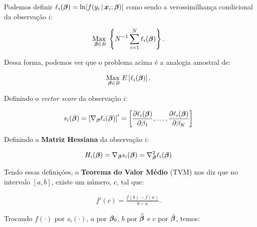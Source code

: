 \documentclass[11pt,oneside,a4paper]{article}
\numberwithin{equation}{section}
\begin{document}
\begin{description}
\begin{description}
\noindent
Podemos definir
$\ell_{i}( \boldsymbol{\beta} ) = \ln[ f( y_{i} \, | \, \boldsymbol{x}_{i} ; \boldsymbol{\beta} ) ]$
como sendo a verossimilhança condicional da observação $i$:

\vspace{-1 em}
\begin{align*}
\underset{\boldsymbol{\beta} \in B}{\text{Max }} 
\left\{ 
N^{-1} \sum_{i=1}^{N} \ell_{i} (\boldsymbol{\beta})
\right\}.
\end{align*}

Dessa forma, podemos ver que o problema acima é a analogia amostral de:

\vspace{-1 em}
\begin{align*}
\underset{\boldsymbol{\beta} \in B}{\text{Max }} 
E \left[ 
\ell_{i} ( \boldsymbol{\beta} )
\right].
\end{align*}

Definindo o \textit{vector score} da observação $i$:

\vspace{-1 em}
\begin{align*}
s_{i} (\boldsymbol{\beta}) = 
\left[ \nabla_{\boldsymbol{\beta}} \ell_{i} (\boldsymbol{\beta}) \right]'
=
\begin{bmatrix}
	\dfrac{\partial{\ell_{i} (\boldsymbol{\beta})}}{\partial{\beta_{1}}},
	\dots,
	\dfrac{\partial{\ell_{i} (\boldsymbol{\beta})}}{\partial{\beta_{K}}}
\end{bmatrix}
\end{align*}

Definindo a \textbf{Matriz Hessiana} da observação $i$:

\vspace{-1 em}
\begin{align*}
H_{i} (\boldsymbol{\beta}) = 
\nabla_{\boldsymbol{\beta}} s_{i} (\boldsymbol{\beta}) = 
\nabla_{\boldsymbol{\beta}}^2 \ell_{i} (\boldsymbol{\beta})
\end{align*}

Tendo essas definições, o \textbf{Teorema do Valor Médio} (TVM) nos diz que no intervalo $[a, b]$, existe um número, $c$, tal que:

\vspace{-1 em}
\begin{align*}
	f'(c) = \frac{f(b) - f(a)}{b - a}.
\end{align*}

\begin{center}
\end{center}

Trocando 
$f(\cdot)$ por $s_{i}(\cdot)$, 
$a$ por $\boldsymbol{\beta}_{0}$, 
$b$ por $\widehat{\boldsymbol{\beta}}$ e
$c$ por $\bar{\boldsymbol{\beta}}$,
temos:


\end{description}
\end{description}
\end{document}
